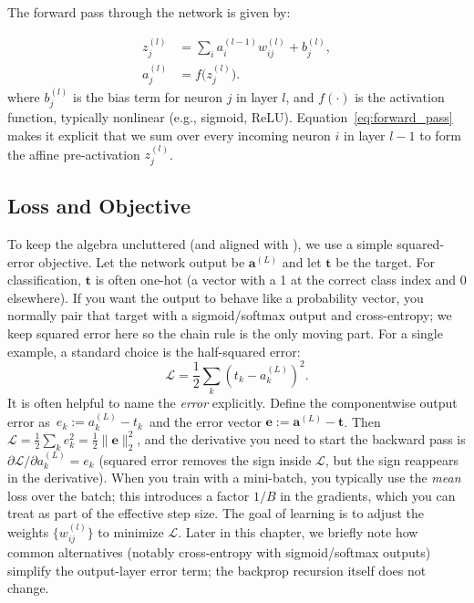 The forward pass through the network is given by:

\begin{equation}
\begin{aligned}
    z_j^{(l)} &= \sum_i a_i^{(l-1)} w_{ij}^{(l)} + b_j^{(l)},\\
    a_j^{(l)} &= f\big(z_j^{(l)}\big).
\end{aligned}
\label{eq:forward_pass}
\end{equation}
where $b_j^{(l)}$ is the bias term for neuron $j$ in layer $l$, and $f(\cdot)$ is the activation function, typically nonlinear (e.g., sigmoid, ReLU). Equation~\eqref{eq:forward_pass} makes it explicit that we sum over every incoming neuron $i$ in layer $l-1$ to form the affine pre-activation $z_j^{(l)}$.

\subsection{Loss and Objective}
\label{sec:backprop_loss_and_objective}

To keep the algebra uncluttered (and aligned with ), we use a simple squared\hyp{}error objective. Let the network output be \(\mathbf{a}^{(L)}\) and let \(\mathbf{t}\) be the target. For classification, \(\mathbf{t}\) is often one\hyp{}hot (a vector with a 1 at the correct class index and 0 elsewhere). If you want the output to behave like a probability vector, you normally pair that target with a sigmoid/softmax output and cross\hyp{}entropy; we keep squared error here so the chain rule is the only moving part. For a single example, a standard choice is the half-squared error:
\begin{equation}
    \mathcal{L} = \frac{1}{2} \sum_k \left( t_k - a_k^{(L)} \right)^2. \label{eq:error_function}
\end{equation}
It is often helpful to name the \emph{error} explicitly. Define the componentwise output error as
\(\,e_k := a_k^{(L)} - t_k\,\) and the error vector \(\mathbf{e}:=\mathbf{a}^{(L)}-\mathbf{t}\). Then
\(\mathcal{L}=\tfrac12\sum_k e_k^2=\tfrac12\|\mathbf{e}\|_2^2\), and the derivative you need to start the backward pass is
\(\partial \mathcal{L}/\partial a_k^{(L)} = e_k\) (squared error removes the sign inside \(\mathcal{L}\), but the sign reappears in the derivative).
When you train with a mini\hyp{}batch, you typically use the \emph{mean} loss over the batch; this introduces a factor \(1/B\) in the gradients, which you can treat as part of the effective step size.
The goal of learning is to adjust the weights \(\{w_{ij}^{(l)}\}\) to minimize \(\mathcal{L}\). Later in this chapter, we briefly note how common alternatives (notably cross\hyp{}entropy with sigmoid/softmax outputs) simplify the output\hyp{}layer error term; the backprop recursion itself does not change.


